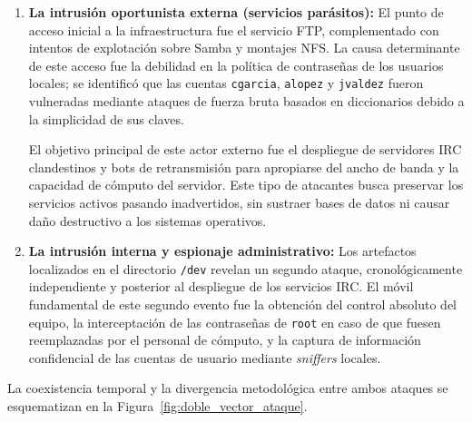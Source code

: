 \begin{enumerate}
    \item \textbf{La intrusión oportunista externa (servicios parásitos):}
    El punto de acceso inicial a la infraestructura fue el servicio FTP, complementado con intentos de explotación sobre Samba y montajes NFS. La causa determinante de este acceso fue la debilidad en la política de contraseñas de los usuarios locales; se identificó que las cuentas \texttt{cgarcia}, \texttt{alopez} y \texttt{jvaldez} fueron vulneradas mediante ataques de fuerza bruta basados en diccionarios debido a la simplicidad de sus claves.
    
    El objetivo principal de este actor externo fue el despliegue de servidores IRC clandestinos y bots de retransmisión para apropiarse del ancho de banda y la capacidad de cómputo del servidor. Este tipo de atacantes busca preservar los servicios activos pasando inadvertidos, sin sustraer bases de datos ni causar daño destructivo a los sistemas operativos.

    \item \textbf{La intrusión interna y espionaje administrativo:}
    Los artefactos localizados en el directorio \texttt{/dev} revelan un segundo ataque, cronológicamente independiente y posterior al despliegue de los servicios IRC. El móvil fundamental de este segundo evento fue la obtención del control absoluto del equipo, la interceptación de las contraseñas de \texttt{root} en caso de que fuesen reemplazadas por el personal de cómputo, y la captura de información confidencial de las cuentas de usuario mediante \textit{sniffers} locales.
\end{enumerate}

La coexistencia temporal y la divergencia metodológica entre ambos ataques se esquematizan en la Figura~\ref{fig:doble_vector_ataque}.

